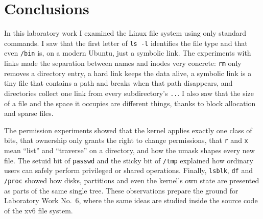 \documentclass[12pt,a4paper]{article}
\begin{document}
\newpage
\section*{Conclusions}

In this laboratory work I examined the Linux file system using only standard commands. I saw that the first letter of \texttt{ls -l} identifies the file type and that even \texttt{/bin} is, on a modern Ubuntu, just a symbolic link. The experiments with links made the separation between names and inodes very concrete: \texttt{rm} only removes a directory entry, a hard link keeps the data alive, a symbolic link is a tiny file that contains a path and breaks when that path disappears, and directories collect one link from every subdirectory's \texttt{..}. I also saw that the size of a file and the space it occupies are different things, thanks to block allocation and sparse files.

The permission experiments showed that the kernel applies exactly one class of bits, that ownership only grants the right to change permissions, that \texttt{r} and \texttt{x} mean ``list'' and ``traverse'' on a directory, and how the umask shapes every new file. The setuid bit of \texttt{passwd} and the sticky bit of \texttt{/tmp} explained how ordinary users can safely perform privileged or shared operations. Finally, \texttt{lsblk}, \texttt{df} and \texttt{/proc} showed how disks, partitions and even the kernel's own state are presented as parts of the same single tree. These observations prepare the ground for Laboratory Work No.~6, where the same ideas are studied inside the source code of the xv6 file system.
\end{document}
